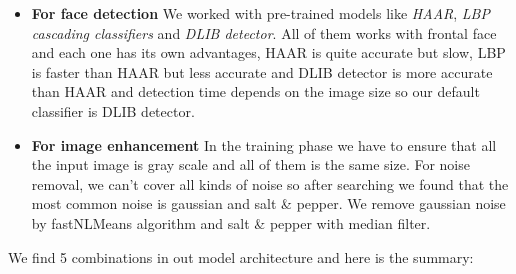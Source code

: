 \begin{itemize}
	\item \textbf{For face detection} \newline We worked with pre-trained models like \textit{HAAR}, \textit{LBP cascading classifiers} and \textit{DLIB detector}. \newline All of them works with frontal face and each one has its own advantages, HAAR is quite accurate but slow, LBP is faster than HAAR but less accurate and DLIB detector is more accurate than HAAR and detection time depends on the image size so our default classifier is DLIB detector. 
	\item \textbf{For image enhancement} \newline In the training phase we have to ensure that all the input image is gray scale and all of them is the same size. \newline For noise removal, we can’t cover all kinds of noise so after searching we found that the most common noise is gaussian and salt \& pepper. \newline  We remove gaussian noise by fastNLMeans algorithm and salt \& pepper with median filter. \newline
\end{itemize}

We find 5 combinations in out model architecture and here is the summary: 

